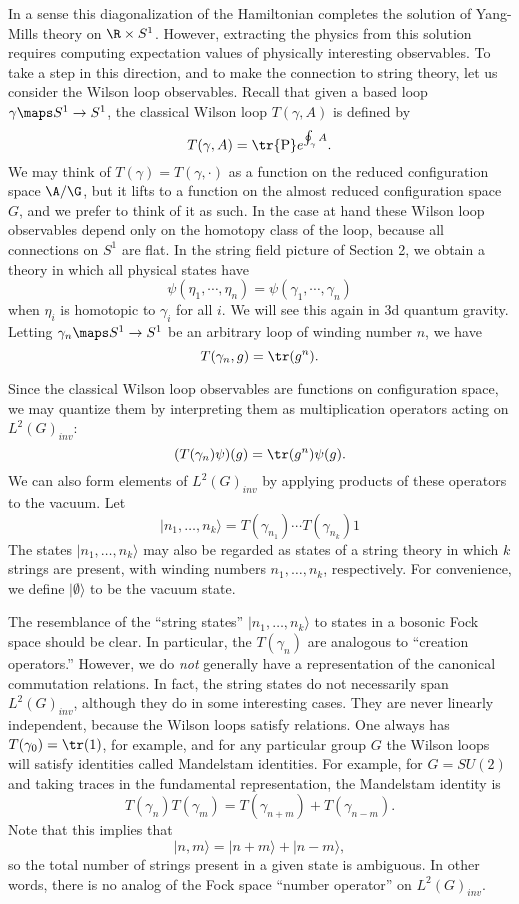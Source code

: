 In a sense this diagonalization of the Hamiltonian
completes the solution of Yang-Mills theory on $\R
\times S^1$.   However, extracting the physics from this solution requires
computing expectation values of physically interesting observables.
To take a step in this direction, and to make the connection to string
theory, let us consider the Wilson loop observables.   Recall that given a
based loop $\gamma \maps S^1 \to S^1$, the classical Wilson loop
$T(\gamma,A)$ is defined by
\[      T(\gamma,A) = \tr {\rm P} e^{ \oint_\gamma A } . \]
We may think of $T(\gamma) = T(\gamma, \cdot)$ as a
function on the reduced configuration space $\A/\G$,
but it lifts to a function
on the almost reduced configuration space $G$, and we prefer to think of
it as such.  In the case at hand these Wilson loop observables depend
only on the homotopy class of the loop, because all connections on $S^1$
are flat.  In the string field picture of Section 2, we obtain a
theory in which all physical states have
\[      \psi(\eta_1, \cdots, \eta_n) =  \psi(\gamma_1, \cdots,
\gamma_n)\]
when $\eta_i$ is homotopic to $\gamma_i$ for all $i$.
We will see this again in 3d quantum gravity.  Letting $\gamma_n \maps
S^1 \to S^1$ be an arbitrary loop of winding number $n$, we have
\[     T(\gamma_n, g) = \tr(g^n)  .\]

Since the classical Wilson loop observables are functions on
configuration space, we may quantize them by interpreting them
as multiplication operators acting on $L^2(G)_{inv}$:
\[       (T(\gamma_n)\psi)(g) = \tr(g^n)\psi(g)  .\]
We can also form elements of $L^2(G)_{inv}$ by applying products of
these operators to the vacuum.  Let
\[     | n_1, \dots, n_k \rangle =  T(\gamma_{n_1}) \cdots T(\gamma_{n_k}) 1 \]
The states
$  | n_1, \dots, n_k \rangle$ may also be regarded as states of a string
theory in
which $k$ strings are present, with winding numbers $n_1, \dots, n_k$,
respectively.    For convenience, we define
$|\emptyset\rangle$ to be the vacuum
state.

The resemblance of the ``string states'' $|n_1, \dots, n_k\rangle$
to states in a bosonic Fock space should be clear.
In particular, the $T(\gamma_n)$ are analogous to ``creation
operators.''  However, we do {\it not} generally have a representation
of the canonical commutation relations.  In fact, the string states
do not necessarily span $L^2(G)_{inv}$, although they do in some
interesting cases.  They are never linearly independent, because
the Wilson loops satisfy relations.  One always has
$T(\gamma_0) = \tr(1)$, for example,
and for any particular group $G$ the Wilson loops will satisfy
identities called Mandelstam identities.
For example, for $G = SU(2)$ and taking traces in the fundamental
representation, the Mandelstam identity is
\[        T(\gamma_n)T(\gamma_m) = T(\gamma_{n+m}) + T(\gamma_{n-m}).\]
Note that this implies that
\[      |n,m\rangle = |n+m\rangle + |n-m\rangle, \]
so the total number of strings present in a given state is ambiguous.
In other words, there is no analog of the Fock space ``number
operator'' on $L^2(G)_{inv}$.

